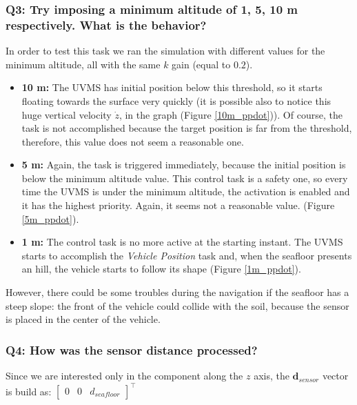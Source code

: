 \documentclass{article}
\begin{document}

\subsubsection{Q3: Try imposing a minimum altitude of 1, 5, 10 m respectively. What is the behavior?}
In order to test this task we ran the simulation with different values for the minimum altitude, all with the same $k$ gain (equal to $0.2$).

\begin{itemize}
    \item \textbf{10 m:} The UVMS has initial position below this threshold, so it starts floating towards the surface very quickly (it is possible also to notice this huge vertical velocity $\dot{z}$, in the graph (Figure \ref{10m_ppdot})). 
    Of course, the task is not accomplished because the target position is far from the threshold, therefore, this value does not seem a reasonable one. %
    \item \textbf{5 m:} Again, the task is triggered immediately, because the initial position is below the minimum altitude value. This control task is a safety one, so every time the UVMS is under the minimum altitude, the activation is enabled and it has the highest priority. 
    Again, it seems not a reasonable value. (Figure \ref{5m_ppdot}).
    \item \textbf{1 m:} The control task is no more active at the starting instant. The UVMS starts to accomplish the \textit{Vehicle Position} task and, when the seafloor presents an hill, the vehicle starts to follow its shape (Figure \ref{1m_ppdot}). 
\end{itemize}
However, there could be some troubles during the navigation if the seafloor has a steep slope: the front of the vehicle could collide with the soil, because the sensor is placed in the center of the vehicle.


\subsubsection{Q4: How was the sensor distance processed?}
 
 Since we are interested only in the component along the $z$ axis, the $\boldsymbol{d}_{sensor}$ vector is build as:
 $\begin{bmatrix}0 & 0 & d_{seafloor} \end{bmatrix}^\top$
 
\end{document}

